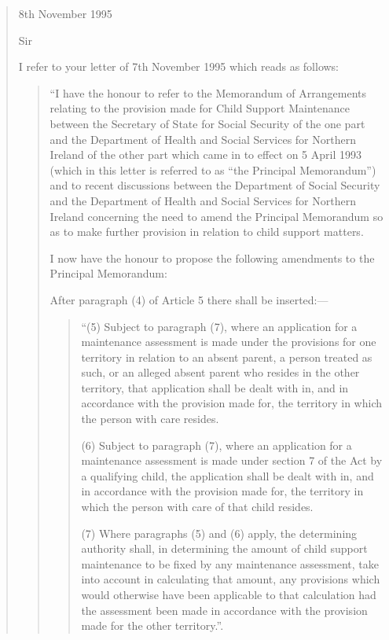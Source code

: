 \documentclass[12pt,a4paper]{article}
\begin{document}
\begin{quotation}
8th November 1995

  Sir

  I refer to your letter of 7th November 1995 which reads as follows:

\begin{quotation}
  “I have the honour to refer to the Memorandum of Arrangements relating to the provision made for Child Support Maintenance between the Secretary of State for Social Security of the one part and the Department of Health and Social Services for Northern Ireland of the other part which came in to effect on 5 April 1993 (which in this letter is referred to as “the Principal Memorandum”) and to recent discussions between the Department of Social Security and the Department of Health and Social Services for Northern Ireland concerning the need to amend the Principal Memorandum so as to make further provision in relation to child support matters.

\begin{sloppypar}
  I now have the honour to propose the following amendments to the Principal Memorandum:
\end{sloppypar}

\begin{sloppypar}
  After paragraph (4) of Article 5 there shall be inserted:—
\end{sloppypar}
\begin{quotation}
 “(5) Subject to paragraph (7), where an application for a maintenance assessment is made under the provisions for one territory in relation to an absent parent, a person treated as such, or an alleged absent parent who resides in the other territory, that application shall be dealt with in, and in accordance with the provision made for, the territory in which the person with care resides.

(6) Subject to paragraph (7), where an application for a maintenance assessment is made under section 7 of the Act by a qualifying child, the application shall be dealt with in, and in accordance with the provision made for, the territory in which the person with care of that child resides.

\begin{sloppypar}
(7) Where paragraphs (5) and (6) apply, the determining authority shall, in determining the amount of child support maintenance to be fixed by any maintenance assessment, take into account in calculating that amount, any provisions which would otherwise have been applicable to that calculation had the assessment been made in accordance with the provision made for the other territory.”.
\end{sloppypar}
\end{quotation}


\end{quotation}
\end{quotation}
\end{document}
